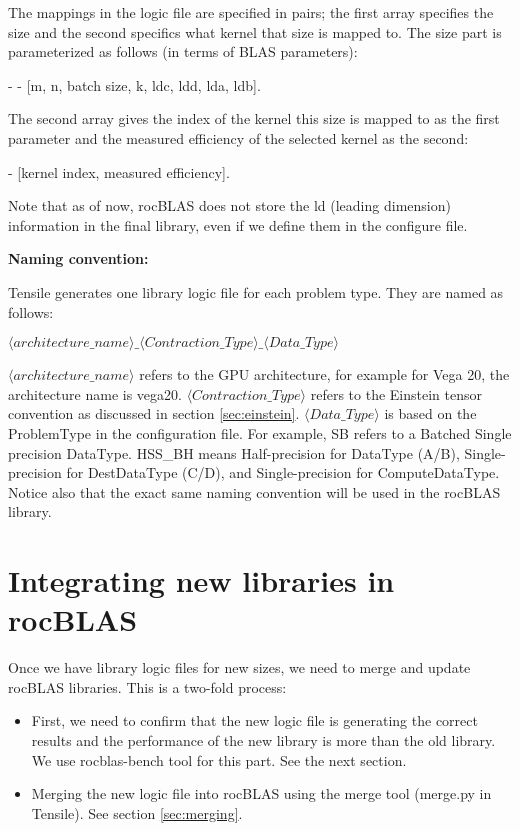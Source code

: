 \documentclass[]{article}
\begin{document}
The mappings in the logic file are specified in pairs; the first array specifies the size and the second specifics what kernel that size is mapped to. The size part is parameterized as follows (in terms of BLAS parameters):

\begin{center}
 	- - [m, n, batch size, k, ldc, ldd, lda, ldb].
\end{center}
\noindent
The second array gives the index of the kernel this size is mapped to as the first parameter and the measured efficiency of the selected kernel as the second:

\begin{center}
	- [kernel index, measured efficiency].
\end{center}

\noindent
Note that as of now, rocBLAS does not store the ld (leading dimension) information in the final library, even if we define them in the configure file.

\bigskip
\noindent

\textbf{\large{Naming convention:}}

\label{sec:naming}
\noindent
Tensile generates one library logic file for each problem type. They are named as follows:
\begin{center}
	$\langle architecture\_name \rangle \_\langle Contraction\_Type \rangle\_ \langle Data\_Type \rangle$
\end{center}

\noindent
$\langle architecture\_name \rangle$ refers to the GPU architecture, for example for Vega 20, the architecture name is vega20. $\langle Contraction\_Type \rangle$ refers to the Einstein tensor convention as discussed in section \ref{sec:einstein}. $\langle Data\_Type \rangle$ is based on the ProblemType in the configuration file. For example, SB refers to a Batched Single precision DataType. HSS\_BH means Half-precision for DataType (A/B), Single-precision for DestDataType (C/D), and Single-precision for ComputeDataType. Notice also that the exact same naming convention will be used in the rocBLAS library.

\section{Integrating new libraries in rocBLAS}
Once we have library logic files for new sizes, we need to merge and update rocBLAS libraries. This is a two-fold process:
\begin{itemize}
\item First, we need to confirm that the new logic file is generating the correct results and the performance of the new library is more than the old library. We use rocblas-bench tool for this part. See the next section.
\item Merging the new logic file into rocBLAS using the merge tool (merge.py in Tensile). See section \ref{sec:merging}.
\end{itemize}
\end{document}
